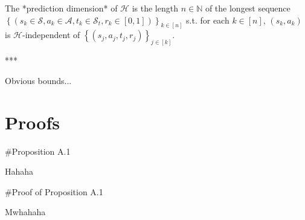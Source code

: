 \documentclass[a4paper]{article}
\newcommand{\AP}[1]{\left(#1\right)}
\newcommand{\AC}[1]{\left\{#1\right\}}
\newcommand{\Nats}{\mathbb{N}}
\newcommand{\A}{\mathcal{A}}
\newcommand{\St}{\mathcal{S}}
\newcommand{\Hy}{\mathcal{H}}
\begin{document}
The *prediction dimension* of $\Hy$ is the length $n\in\Nats$ of the longest sequence\\$\AC{\AP{s_k\in\St,a_k\in\A,t_k\in\St_t,r_k\in[0,1]}}_{k\in[n]}$ s.t. for each $k\in[n]$, $\AP{s_k,a_k}$ is $\Hy$-independent of $\AC{\AP{s_j,a_j,t_j,r_j}}_{j\in[k]}$.

***

Obvious bounds...


\section{Proofs}

\#Proposition A.1

Hahaha

\#Proof of Proposition A.1

Mwhahaha
\end{document}
